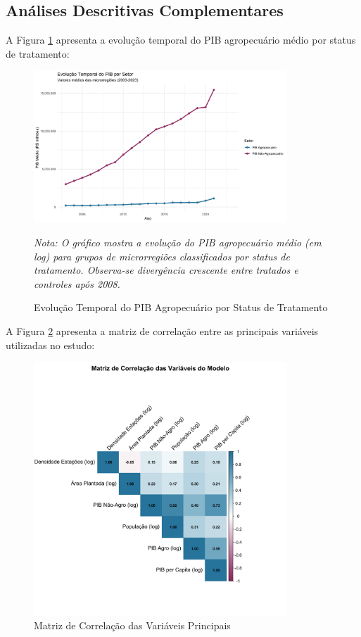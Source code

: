 \documentclass[
	12pt,				%
	oneside,			%
	a4paper,			%
	english,			%
	french,				%
	spanish,			%
	brazil				%
	]{abntex2}
\begin{document}
\begin{apendicesenv}
\section{Análises Descritivas Complementares}

A Figura \ref{fig:evolucao_pib} apresenta a evolução temporal do PIB agropecuário médio por status de tratamento:

\begin{figure}[h]
\centering
\caption{Evolução Temporal do PIB Agropecuário por Status de Tratamento}
\label{fig:evolucao_pib}
\includegraphics[width=0.85\textwidth]{../../../data/outputs/descriptive_analysis/evolucao_temporal_pib.png}

\textit{Nota: O gráfico mostra a evolução do PIB agropecuário médio (em log) para grupos de microrregiões classificados por status de tratamento. Observa-se divergência crescente entre tratados e controles após 2008.}
\end{figure}

A Figura \ref{fig:correlacao} apresenta a matriz de correlação entre as principais variáveis utilizadas no estudo:

\begin{figure}[h]
\centering
\caption{Matriz de Correlação das Variáveis Principais}
\label{fig:correlacao}
\includegraphics[width=0.85\textwidth]{../../../data/outputs/descriptive_analysis/matriz_correlacao.png}


\end{figure}
\end{apendicesenv}
\end{document}
